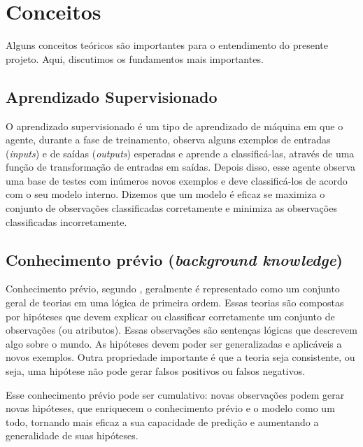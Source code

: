 \chapter{Conceitos}
\label{cap:conceitos}

Alguns conceitos teóricos são importantes para o entendimento do presente projeto. Aqui, discutimos os fundamentos mais importantes.

\section{Aprendizado Supervisionado}
\label{sec:fundamentos}

O aprendizado supervisionado é um tipo de aprendizado de máquina em que o agente, durante a fase de treinamento, observa alguns exemplos de entradas (\textit{inputs}) e de saídas (\textit{outputs}) esperadas e aprende a classificá-las, através de uma função de transformação de entradas em saídas. Depois disso, esse agente observa uma base de testes com inúmeros novos exemplos e deve classificá-los de acordo com o seu modelo interno. Dizemos que um modelo é eficaz se maximiza o conjunto de observações classificadas corretamente e minimiza as observações classificadas incorretamente.

\section{Conhecimento prévio (\textit{background knowledge})}
\label{sec:fundamentos}

Conhecimento prévio, segundo \citet[capítulo 19]{AIMA}, geralmente é representado como um conjunto geral de teorias em uma lógica de primeira ordem. Essas teorias são compostas por hipóteses que devem explicar ou classificar corretamente um conjunto de observações (ou atributos). Essas observações são sentenças lógicas que descrevem algo sobre o mundo. As hipóteses devem poder ser generalizadas e  aplicáveis a novos exemplos. Outra propriedade importante é que a teoria seja consistente, ou seja, uma hipótese não pode gerar falsos positivos ou falsos negativos.

Esse conhecimento prévio pode ser cumulativo: novas observações podem gerar novas hipóteses, que enriquecem o conhecimento prévio e o modelo como um todo, tornando mais eficaz a sua capacidade de predição e aumentando a generalidade de suas hipóteses.

